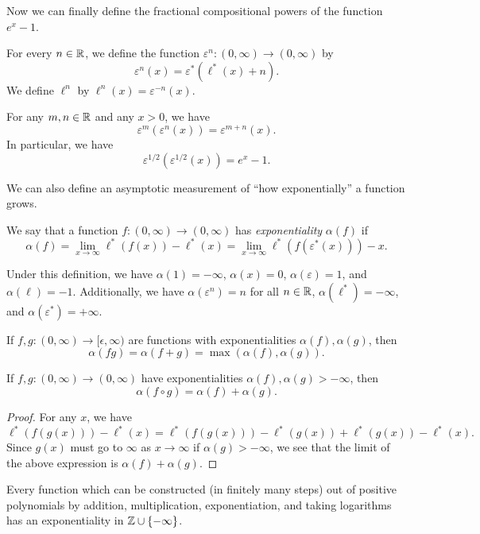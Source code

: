 \documentclass[letterpaper,11pt]{article}
\begin{document}
Now we can finally define the fractional compositional powers of the function $e^x - 1$.

\begin{defn} For every $n \in \mathbb{R}$, we define the function $\varepsilon^n : (0,\infty) \rightarrow (0,\infty)$ by
\[
\varepsilon^n(x) = \varepsilon^*(\ell^*(x) + n).
\]
We define $\ell^n$ by $\ell^n(x) = \varepsilon^{-n}(x)$.
\end{defn}

\begin{prop} For any $m,n \in \mathbb{R}$ and any $x > 0$, we have
\[
\varepsilon^m(\varepsilon^n(x)) = \varepsilon^{m+n}(x).
\]
In particular, we have
\[
\varepsilon^{1/2}(\varepsilon^{1/2}(x)) = e^x - 1.
\]
\end{prop}

We can also define an asymptotic measurement of ``how exponentially'' a function grows.

\begin{defn} We say that a function $f:(0,\infty) \rightarrow (0,\infty)$ has \emph{exponentiality} $\alpha(f)$ if
\[
\alpha(f) = \lim_{x\rightarrow \infty} \ell^*(f(x)) - \ell^*(x) = \lim_{x \rightarrow \infty} \ell^*(f(\varepsilon^*(x))) - x.
\]
\end{defn}

Under this definition, we have $\alpha(1) = -\infty$, $\alpha(x) = 0$, $\alpha(\varepsilon) = 1$, and $\alpha(\ell) = -1$. Additionally, we have $\alpha(\varepsilon^n) = n$ for all $n \in \mathbb{R}$, $\alpha(\ell^*) = -\infty$, and $\alpha(\varepsilon^*) = +\infty$.

\begin{prop} If $f,g : (0,\infty) \rightarrow [\epsilon,\infty)$ are functions with exponentialities $\alpha(f), \alpha(g)$, then
\[
\alpha(fg) = \alpha(f+g) = \max(\alpha(f),\alpha(g)).
\]
\end{prop}

\begin{prop} If $f,g : (0,\infty) \rightarrow (0,\infty)$ have exponentialities $\alpha(f), \alpha(g) > -\infty$, then
\[
\alpha(f \circ g) = \alpha(f) + \alpha(g).
\]
\end{prop}
\begin{proof} For any $x$, we have
\[
\ell^*(f(g(x))) - \ell^*(x) = \ell^*(f(g(x))) - \ell^*(g(x)) + \ell^*(g(x)) - \ell^*(x).
\]
Since $g(x)$ must go to $\infty$ as $x \rightarrow \infty$ if $\alpha(g) > -\infty$, we see that the limit of the above expression is $\alpha(f) + \alpha(g)$.
\end{proof}

\begin{cor} Every function which can be constructed (in finitely many steps) out of positive polynomials by addition, multiplication, exponentiation, and taking logarithms has an exponentiality in $\mathbb{Z} \cup \{-\infty\}$.
\end{cor}
\end{document}
